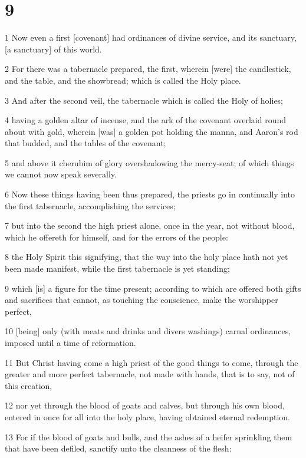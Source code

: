 \chapter{9}

\par 1 Now even a first [covenant] had ordinances of divine service, and its sanctuary, [a sanctuary] of this world.
\par 2 For there was a tabernacle prepared, the first, wherein [were] the candlestick, and the table, and the showbread; which is called the Holy place.
\par 3 And after the second veil, the tabernacle which is called the Holy of holies;
\par 4 having a golden altar of incense, and the ark of the covenant overlaid round about with gold, wherein [was] a golden pot holding the manna, and Aaron's rod that budded, and the tables of the covenant;
\par 5 and above it cherubim of glory overshadowing the mercy-seat; of which things we cannot now speak severally.
\par 6 Now these things having been thus prepared, the priests go in continually into the first tabernacle, accomplishing the services;
\par 7 but into the second the high priest alone, once in the year, not without blood, which he offereth for himself, and for the errors of the people:
\par 8 the Holy Spirit this signifying, that the way into the holy place hath not yet been made manifest, while the first tabernacle is yet standing;
\par 9 which [is] a figure for the time present; according to which are offered both gifts and sacrifices that cannot, as touching the conscience, make the worshipper perfect,
\par 10 [being] only (with meats and drinks and divers washings) carnal ordinances, imposed until a time of reformation.
\par 11 But Christ having come a high priest of the good things to come, through the greater and more perfect tabernacle, not made with hands, that is to say, not of this creation,
\par 12 nor yet through the blood of goats and calves, but through his own blood, entered in once for all into the holy place, having obtained eternal redemption.
\par 13 For if the blood of goats and bulls, and the ashes of a heifer sprinkling them that have been defiled, sanctify unto the cleanness of the flesh:
